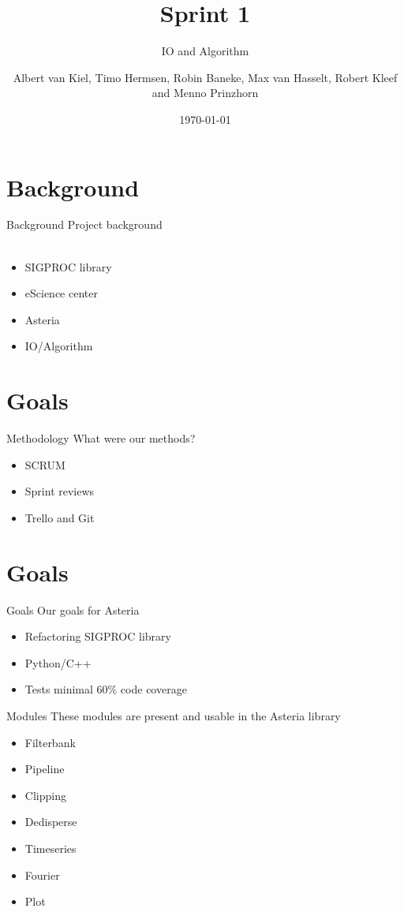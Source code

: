\documentclass{beamer}
\title{Sprint 1}
\subtitle{IO and Algorithm}
\author{Albert van Kiel, Timo Hermsen, Robin Baneke, Max van Hasselt, Robert Kleef and Menno Prinzhorn}
\date{\today}
\begin{document}
\begin{frame}
    \titlepage
\end{frame}

\section{Background}
    
\begin{frame}{Background}
    Project background
    \\~\\
    \begin{itemize}
        \item SIGPROC library
        \item eScience center
        \item Asteria
        \item IO/Algorithm
    \end{itemize}
\end{frame}

\section{Goals}
	\begin{frame}{Methodology}
	What were our methods?     
	\begin{itemize}
		\item SCRUM
		\item Sprint reviews
		\item Trello and Git
	\end{itemize}
\end{frame}

\section{Goals}
\begin{frame}{Goals}
    Our goals for Asteria      
    \begin{itemize}
        \item Refactoring SIGPROC library
        \item Python/C++
        \item Tests minimal 60\% code coverage
    \end{itemize}
\end{frame}

\begin{frame}{Modules}
	These modules are present and usable in the Asteria library     
	\begin{itemize}
		\item Filterbank
		\item Pipeline
		\item Clipping
		\item Dedisperse
		\item Timeseries
		\item Fourier
		\item Plot
	\end{itemize}
\end{frame}
\end{document}

